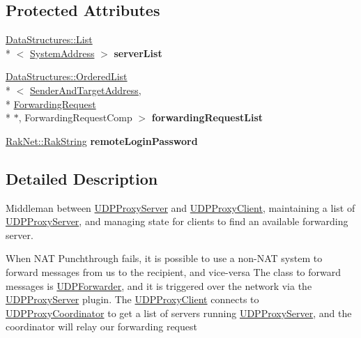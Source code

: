 \subsection*{Protected Attributes}
\begin{DoxyCompactItemize}
\item 
\hypertarget{class_rak_net_1_1_u_d_p_proxy_coordinator_aa158012c694da7aaed3dac591520695f}{\hyperlink{class_data_structures_1_1_list}{Data\-Structures\-::\-List}\\*
$<$ \hyperlink{struct_rak_net_1_1_system_address}{System\-Address} $>$ {\bfseries server\-List}}\label{class_rak_net_1_1_u_d_p_proxy_coordinator_aa158012c694da7aaed3dac591520695f}

\item 
\hypertarget{class_rak_net_1_1_u_d_p_proxy_coordinator_a28fc5f9c482f15720a061f2a99c7a823}{\hyperlink{class_data_structures_1_1_ordered_list}{Data\-Structures\-::\-Ordered\-List}\\*
$<$ \hyperlink{struct_rak_net_1_1_u_d_p_proxy_coordinator_1_1_sender_and_target_address}{Sender\-And\-Target\-Address}, \\*
\hyperlink{struct_rak_net_1_1_u_d_p_proxy_coordinator_1_1_forwarding_request}{Forwarding\-Request} \\*
$\ast$, Forwarding\-Request\-Comp $>$ {\bfseries forwarding\-Request\-List}}\label{class_rak_net_1_1_u_d_p_proxy_coordinator_a28fc5f9c482f15720a061f2a99c7a823}

\item 
\hypertarget{class_rak_net_1_1_u_d_p_proxy_coordinator_a1ce808d02bf71d034f0f5f0b8df666d3}{\hyperlink{class_rak_net_1_1_rak_string}{Rak\-Net\-::\-Rak\-String} {\bfseries remote\-Login\-Password}}\label{class_rak_net_1_1_u_d_p_proxy_coordinator_a1ce808d02bf71d034f0f5f0b8df666d3}

\end{DoxyCompactItemize}


\subsection{Detailed Description}
Middleman between \hyperlink{class_rak_net_1_1_u_d_p_proxy_server}{U\-D\-P\-Proxy\-Server} and \hyperlink{class_rak_net_1_1_u_d_p_proxy_client}{U\-D\-P\-Proxy\-Client}, maintaining a list of \hyperlink{class_rak_net_1_1_u_d_p_proxy_server}{U\-D\-P\-Proxy\-Server}, and managing state for clients to find an available forwarding server. 

When N\-A\-T Punchthrough fails, it is possible to use a non-\/\-N\-A\-T system to forward messages from us to the recipient, and vice-\/versa The class to forward messages is \hyperlink{class_rak_net_1_1_u_d_p_forwarder}{U\-D\-P\-Forwarder}, and it is triggered over the network via the \hyperlink{class_rak_net_1_1_u_d_p_proxy_server}{U\-D\-P\-Proxy\-Server} plugin. The \hyperlink{class_rak_net_1_1_u_d_p_proxy_client}{U\-D\-P\-Proxy\-Client} connects to \hyperlink{class_rak_net_1_1_u_d_p_proxy_coordinator}{U\-D\-P\-Proxy\-Coordinator} to get a list of servers running \hyperlink{class_rak_net_1_1_u_d_p_proxy_server}{U\-D\-P\-Proxy\-Server}, and the coordinator will relay our forwarding request 


